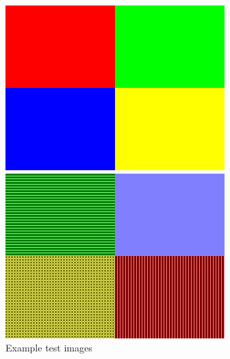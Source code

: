 \begin{appendices}
\begin{figure}[ht]
	\begin{minipage}[]{0.5\linewidth}
		\centering
		\includegraphics[width = 0.6\linewidth]{figs/test_imgs/color_cat_1}
	\end{minipage}
	\begin{minipage}[]{0.5\linewidth}
		\centering
		\includegraphics[width = 0.6\linewidth]{figs/test_imgs/color_freq_cat_4}
	\end{minipage}
	\caption{Example test images}
	\label{fig:example-test-images}
\end{figure}


\end{appendices}
